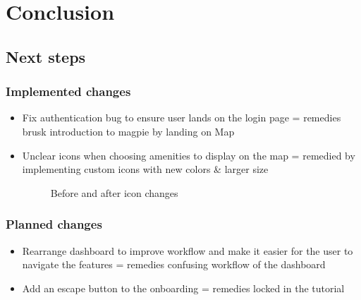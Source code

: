 \documentclass{report}
\begin{document}
\chapter{Conclusion}
\section{Next steps}
\subsection{Implemented changes}
\begin{itemize}
    \item Fix authentication bug to ensure user lands on the login page = remedies brusk introduction to magpie by landing on Map
    \item Unclear icons when choosing amenities to display on the map = remedied by implementing custom icons with new colors \& larger size
          \begin{figure}
              \centering
              \caption{Before and after icon changes}
              \label{fig:plot12}
          \end{figure}
\end{itemize}
\subsection{Planned changes}
\begin{itemize}
    \item Rearrange dashboard to improve workflow and make it easier for the user to navigate the features = remedies confusing workflow of the dashboard
    \item Add an escape button to the onboarding = remedies locked in the tutorial
\end{itemize}


\newpage
{}
\end{document}
